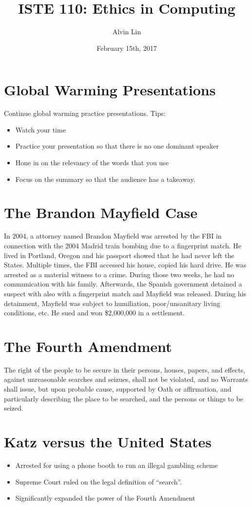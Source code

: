 \documentclass[letterpaper, 12pt]{article}
\title{ISTE 110: Ethics in Computing}
\author{Alvin Lin}
\date{February 15th, 2017}
\begin{document}
\maketitle

\section*{Global Warming Presentations}
Continue global warming practice presentations. Tips:
\begin{itemize}
  \item Watch your time
  \item Practice your presentation so that there is no one dominant speaker
  \item Hone in on the relevancy of the words that you use
  \item Focus on the summary so that the audience has a takeaway.
\end{itemize}

\section*{The Brandon Mayfield Case}
In 2004, a attorney named Brandon Mayfield was arrested by the FBI in connection
with the 2004 Madrid train bombing due to a fingerprint match. He lived in
Portland, Oregon and his passport showed that he had never left the States.
Multiple times, the FBI accessed his house, copied his hard drive. He was
arrested as a material witness to a crime. During those two weeks, he had no
communication with his family. Afterwards, the Spanish government detained a
suspect with also with a fingerprint match and Mayfield was released. During
his detainment, Mayfield was subject to humiliation, poor/unsanitary living
conditions, etc. He sued and won \$2,000,000 in a settlement.

\section*{The Fourth Amendment}
The right of the people to be secure in their persons, houses, papers, and
effects, against unreasonable searches and seizues, shall not be violated, and
no Warrants shall issue, but upon probable cause, supported by Oath or
affirmation, and particularly describing the place to be searched, and the
persons or things to be seized.

\section*{Katz versus the United States}
\begin{itemize}
  \item Arrested for using a phone booth to run an illegal gambling scheme
  \item Supreme Court ruled on the legal definition of ``search''.
  \item Significantly expanded the power of the Fourth Amendment
\end{itemize}
\end{document}
